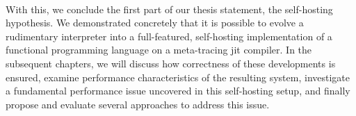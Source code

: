 
		\paragraph{}%
			With this, we conclude the first part of our thesis statement, the self-hosting hypothesis. We demonstrated concretely that it is possible to evolve a rudimentary interpreter into a full-featured, self-hosting implementation of a functional programming language on a meta-tracing \gls{jit} compiler. In the subsequent chapters, we will discuss how correctness of these developments is ensured, examine performance characteristics of the resulting system, investigate a fundamental performance issue uncovered in this self-hosting setup, and finally propose and evaluate several approaches to address this issue.




